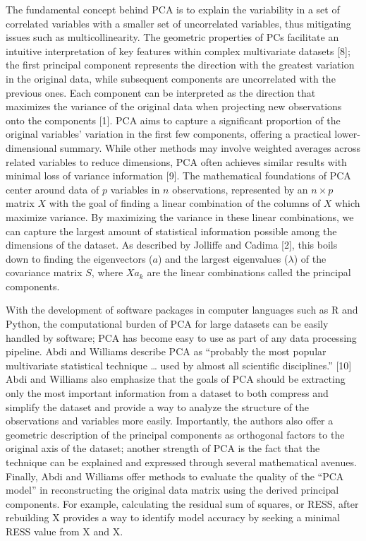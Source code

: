 \documentclass[
  letterpaper,
  DIV=11,
  numbers=noendperiod]{scrreprt}
\begin{document}
The fundamental concept behind PCA is to explain the variability in a
set of correlated variables with a smaller set of uncorrelated
variables, thus mitigating issues such as multicollinearity. The
geometric properties of PCs facilitate an intuitive interpretation of
key features within complex multivariate datasets {[}8{]}; the first
principal component represents the direction with the greatest variation
in the original data, while subsequent components are uncorrelated with
the previous ones. Each component can be interpreted as the direction
that maximizes the variance of the original data when projecting new
observations onto the components {[}1{]}. PCA aims to capture a
significant proportion of the original variables' variation in the first
few components, offering a practical lower-dimensional summary. While
other methods may involve weighted averages across related variables to
reduce dimensions, PCA often achieves similar results with minimal loss
of variance information {[}9{]}. The mathematical foundations of PCA
center around data of \(p\) variables in \(n\) observations, represented
by an \(n \times p\) matrix \(X\) with the goal of finding a linear
combination of the columns of \(X\) which maximize variance. By
maximizing the variance in these linear combinations, we can capture the
largest amount of statistical information possible among the dimensions
of the dataset. As described by Jolliffe and Cadima {[}2{]}, this boils
down to finding the eigenvectors (\(a\)) and the largest eigenvalues
(\(\lambda\)) of the covariance matrix \(S\), where \(Xa_k\) are the
linear combinations called the principal components.

With the development of software packages in computer languages such as
R and Python, the computational burden of PCA for large datasets can be
easily handled by software; PCA has become easy to use as part of any
data processing pipeline. Abdi and Williams describe PCA as ``probably
the most popular multivariate statistical technique \ldots{} used by
almost all scientific disciplines.'' {[}10{]} Abdi and Williams also
emphasize that the goals of PCA should be extracting only the most
important information from a dataset to both compress and simplify the
dataset and provide a way to analyze the structure of the observations
and variables more easily. Importantly, the authors also offer a
geometric description of the principal components as orthogonal factors
to the original axis of the dataset; another strength of PCA is the fact
that the technique can be explained and expressed through several
mathematical avenues. Finally, Abdi and Williams offer methods to
evaluate the quality of the ``PCA model'' in reconstructing the original
data matrix using the derived principal components. For example,
calculating the residual sum of squares, or RESS, after rebuilding X
provides a way to identify model accuracy by seeking a minimal RESS
value from X and X.~
\end{document}
